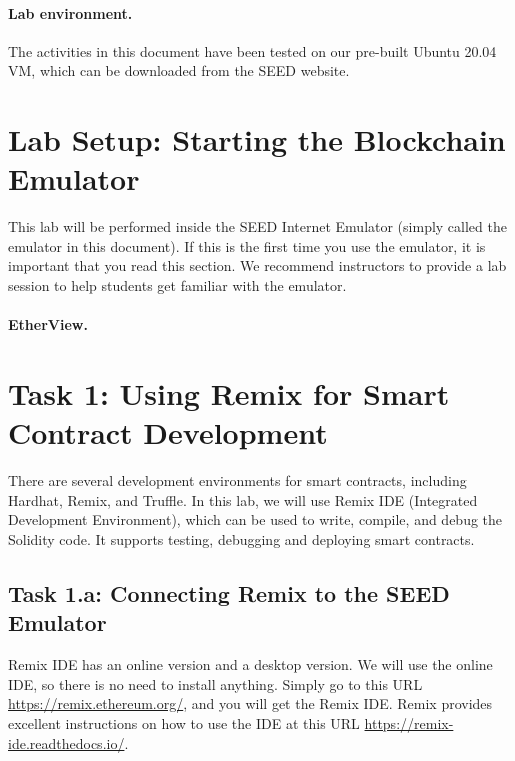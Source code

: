 \paragraph{Lab environment.} The activities in this document 
have been tested on our pre-built
Ubuntu 20.04 VM, which can be downloaded from the SEED website.  


\section{Lab Setup: Starting the Blockchain Emulator}

This lab will be performed inside the SEED Internet Emulator (simply
called the emulator in this document). If this is the first time you
use the emulator, it is important that you read this section.
We recommend instructors to provide a lab session to
help students get familiar with the emulator.





\paragraph{EtherView.}




\section{Task 1: Using Remix for Smart Contract Development} 

There are several development environments for smart contracts, including
Hardhat, Remix, and Truffle. In this lab, we will use 
Remix IDE (Integrated Development Environment), which can be
used to write, compile, and debug the Solidity code. 
It supports testing, debugging and deploying smart contracts. 


\subsection{Task 1.a: Connecting Remix to the SEED Emulator} 

Remix IDE has an online version and a desktop version. 
We will use the online IDE, so there is no need to install anything. 
Simply go to this URL \url{https://remix.ethereum.org/}, and you 
will get the Remix IDE. Remix provides excellent instructions on 
how to use the IDE at this URL \url{https://remix-ide.readthedocs.io/}. 


